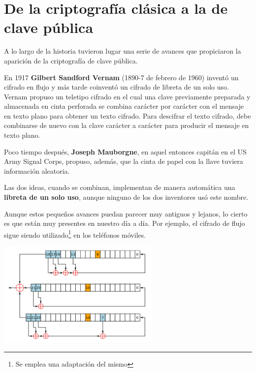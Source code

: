 \chapter{De la criptografía clásica a la de clave pública}

A lo largo de la historia tuvieron lugar una serie de avances que propiciaron la aparición de la criptografía de clave pública. 


En 1917 \textbf{Gilbert Sandford Vernam} (1890-7 de febrero de 1960) inventó un cifrado en flujo y más tarde coinventó un cifrado de libreta de un solo uso. Vernam propuso un teletipo cifrado en el cual una clave previamente preparada y almacenada en cinta perforada se combina carácter por carácter con el mensaje en texto plano para obtener un texto cifrado. Para descifrar el texto cifrado, debe combinarse de nuevo con la clave carácter a carácter para producir el mensaje en texto plano.

Poco tiempo después, \textbf{Joseph Mauborgne}, en aquel entonces capitán en el US Army Signal Corps, propuso, además, que la cinta de papel con la llave tuviera información aleatoria. 

Las dos ideas, cuando se combinan, implementan de manera automática una \textbf{libreta de un solo uso}, aunque ninguno de los dos inventores usó este nombre.

Aunque estos pequeños avances puedan parecer muy antiguos y lejanos, lo cierto es que están muy presentes en nuestro día a día. Por ejemplo, el cifrado de flujo sigue siendo utilizado\footnote{Se emplea una adaptación del mismo} en los teléfonos móviles.

\begin{center}
\includegraphics[width=0.6\textwidth]{img/cifrado_flujo.png}
\end{center}

